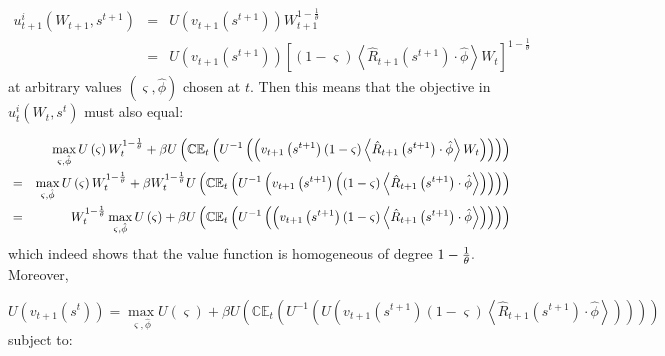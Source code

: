 \documentclass{article}
\begin{document}
\begin{eqnarray*}
u_{t+1}^{i}\left( W_{t+1},s^{t+1}\right) &=&U\left( v_{t+1}\left(
s^{t+1}\right) \right) W_{t+1}^{1-\frac{1}{\theta }} \\
&=&U\left( v_{t+1}\left( s^{t+1}\right) \right) \left[ \left( 1-\varsigma
\right) \left\langle \hat{R}_{t+1}\left( s^{t+1}\right) \cdot \hat{\phi}%
\right\rangle W_{t}\right] ^{1-\frac{1}{\theta }}
\end{eqnarray*}%
at arbitrary values $\left( \varsigma ,\hat{\phi}\right) $ chosen at $t$.
Then this means that the objective in $u_{t}^{i}\left( W_{t},s^{t}\right) $
must also equal:

\begin{eqnarray*}
&&\max_{\varsigma ,\hat{\phi}}U\left( \varsigma \right) W_{t}^{1-\frac{1}{%
\theta }}+\beta U\left( \mathbb{CE}_{t}\left( U^{-1}\left( \left(
v_{t+1}\left( s^{t+1}\right) \left( 1-\varsigma \right) \left\langle \hat{R}%
_{t+1}\left( s^{t+1}\right) \cdot \hat{\phi}\right\rangle W_{t}\right)
\right) \right) \right) \\
&=&\max_{\varsigma ,\hat{\phi}}U\left( \varsigma \right) W_{t}^{1-\frac{1}{%
\theta }}+\beta W_{t}^{1-\frac{1}{\theta }}U\left( \mathbb{CE}_{t}\left(
U^{-1}\left( v_{t+1}\left( s^{t+1}\right) \left( \left( 1-\varsigma \right)
\left\langle \hat{R}_{t+1}\left( s^{t+1}\right) \cdot \hat{\phi}%
\right\rangle \right) \right) \right) \right) \\
&=&W_{t}^{1-\frac{1}{\theta }}\max_{\varsigma ,\hat{\phi}}U\left( \varsigma
\right) +\beta U\left( \mathbb{CE}_{t}\left( U^{-1}\left( \left(
v_{t+1}\left( s^{t+1}\right) \left( 1-\varsigma \right) \left\langle \hat{R}%
_{t+1}\left( s^{t+1}\right) \cdot \hat{\phi}\right\rangle \right) \right)
\right) \right)
\end{eqnarray*}%
which indeed shows that the value function is homogeneous of degree $1-\frac{%
1}{\theta }.$ Moreover,

\begin{equation*}
U\left( v_{t+1}\left( s^{t}\right) \right) =\max_{\varsigma ,\hat{\phi}%
}U\left( \varsigma \right) +\beta U\left( \mathbb{CE}_{t}\left( U^{-1}\left(
U\left( v_{t+1}\left( s^{t+1}\right) \left( 1-\varsigma \right) \left\langle
\hat{R}_{t+1}\left( s^{t+1}\right) \cdot \hat{\phi}\right\rangle \right)
\right) \right) \right)
\end{equation*}%
subject to:
\end{document}
